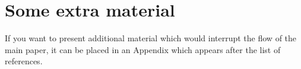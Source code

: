 \documentclass[fleqn,usenatbib]{mnras}
\begin{document}


\appendix

\section{Some extra material}

If you want to present additional material which would interrupt the flow of the main paper,
it can be placed in an Appendix which appears after the list of references.



\bsp	%
\label{lastpage}
\end{document}
